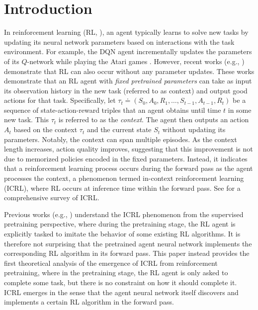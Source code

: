 \documentclass{article}
\begin{document}
\section{Introduction}
In reinforcement learning (RL, \citet{sutton2018reinforcement}), an agent typically learns to solve new tasks by updating its neural network parameters based on interactions with the task environment.
For example,
the DQN agent \citep{mnih2015human} incrementally updates the parameters of its $Q$-network while playing the Atari games \citep{bellemare13arcade}.
However,
recent works (e.g., \citet{duan2016rl,wang2016learning,laskin2022context}) 
demonstrate that RL can also occur without any parameter updates.
These works demonstrate that an RL agent with \emph{fixed pretrained parameters} can take as input its observation history in the new task (referred to as context) and output good actions for that task. 
Specifically, let $\tau_t \doteq (S_0, A_0, R_1, \dots, S_{t-1}, A_{t-1}, R_t)$ be a sequence of state-action-reward triples that an agent obtains until time $t$ in some new task.
This $\tau_t$ is referred to as the \emph{context}. The agent then outputs an action $A_t$ based on the context $\tau_t$ and the current state $S_t$ without updating its parameters.
Notably, the context can span multiple episodes.
As the context length increases, action quality improves, suggesting that this improvement is not due to memorized policies encoded in the fixed parameters. Instead, it indicates that a reinforcement learning process occurs during the forward pass as the agent processes the context, a phenomenon termed in-context reinforcement learning (ICRL), where RL occurs at inference time within the forward pass.
See \citet{moeini2025survey} for a comprehensive survey of ICRL.

Previous works (e.g., \citet{lin2023transformers}) understand the ICRL phenomenon from the supervised pretraining perspective,
where during the pretraining stage,
the RL agent is explicitly tasked to imitate the behavior of some existing RL algorithms.
It is therefore not surprising that the pretrained agent neural network implements the corresponding RL algorithm in its forward pass.
This paper
instead provides the first theoretical analysis of the emergence of ICRL from reinforcement pretraining,
where in the pretraining stage,
the RL agent is only asked to complete some task, but there is no constraint on how it should complete it.
ICRL emerges in the sense that the agent neural network itself discovers and implements a certain RL algorithm in the forward pass.
\end{document}
